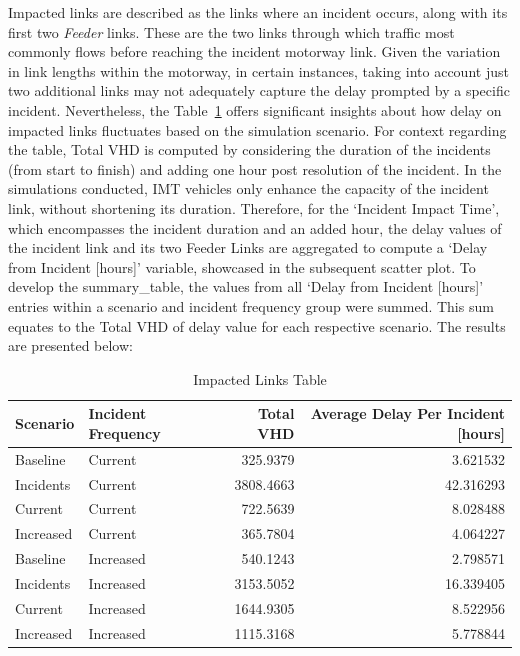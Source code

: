 \documentclass[fancy, oneside, mastersfancy, ms]{byuthesis}
\begin{document}
Impacted links are described as the links where an incident occurs,
along with its first two \emph{Feeder} links. These are the two links
through which traffic most commonly flows before reaching the incident
motorway link. Given the variation in link lengths within the motorway,
in certain instances, taking into account just two additional links may
not adequately capture the delay prompted by a specific incident.
Nevertheless, the Table~\ref{tbl-impacted_links} offers significant
insights about how delay on impacted links fluctuates based on the
simulation scenario. For context regarding the table, Total VHD is
computed by considering the duration of the incidents (from start to
finish) and adding one hour post resolution of the incident. In the
simulations conducted, IMT vehicles only enhance the capacity of the
incident link, without shortening its duration. Therefore, for the
`Incident Impact Time', which encompasses the incident duration and an
added hour, the delay values of the incident link and its two Feeder
Links are aggregated to compute a `Delay from Incident {[}hours{]}'
variable, showcased in the subsequent scatter plot. To develop the
summary\_table, the values from all `Delay from Incident {[}hours{]}'
entries within a scenario and incident frequency group were summed. This
sum equates to the Total VHD of delay value for each respective
scenario. The results are presented below:

\hypertarget{tbl-impacted_links}{}
\begin{table}
\caption{\label{tbl-impacted_links}Impacted Links Table }\tabularnewline

\centering
\begin{tabular}[t]{llrr}
\toprule
Scenario & Incident Frequency & Total VHD & Average Delay Per Incident [hours]\\
\midrule
Baseline & Current & 325.9379 & 3.621532\\
Incidents & Current & 3808.4663 & 42.316293\\
Current & Current & 722.5639 & 8.028488\\
Increased & Current & 365.7804 & 4.064227\\
Baseline & Increased & 540.1243 & 2.798571\\
\addlinespace
Incidents & Increased & 3153.5052 & 16.339405\\
Current & Increased & 1644.9305 & 8.522956\\
Increased & Increased & 1115.3168 & 5.778844\\
\bottomrule
\end{tabular}
\end{table}
\end{document}
